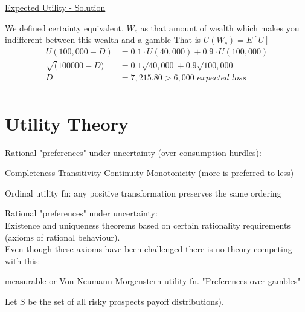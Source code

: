 \documentclass[
14pt,notheorems,hyperref={pdfauthor=whatever}
]{beamer}
\begin{document}
\begin{frame}
\underline{Expected Utility - Solution}
\hfill \break
\begin{outline}
    \1 We defined certainty equivalent, $W_c$  as that amount of wealth which makes you indifferent between this wealth and a gamble\break
    \1 That is $U(W_c) = E[U]$
    \begin{align*}
        U(100,000 - D) &= 0.1\cdot U(40,000) + 0.9\cdot U(100,000)\\
        \sqrt(100000-D) &= 0.1\sqrt{40,000} + 0.9\sqrt{100,000}\\
        D &= 7,215.80 > 6,000 \textit{ expected loss }\\
    \end{align*}
\end{outline}
\end{frame}


\section{Utility Theory}  %

\begin{frame}
Rational "preferences" under uncertainty (over consumption hurdles):\\
\begin{outline}
    \1 Completeness
    \1 Transitivity
    \1 Continuity
    \1 Monotonicity (more is preferred to less)
\end{outline}
Ordinal utility fn: any positive transformation preserves the same ordering\\
\end{frame}

\begin{frame}
Rational "preferences" under uncertainty:\\
\hfill \break
Existence and uniqueness theorems based on certain rationality requirements (axioms of rational behaviour).\\
\hfill \break
Even though these axioms have been challenged there is no theory competing with this:\\
\begin{outline}
    \1 measurable or Von Neumann-Morgenstern utility fn.
      \2 "Preferences over gambles"
\end{outline}
\hfill \break
Let $S$ be the set of all risky prospects  payoff distributions).\\
\end{frame}
\end{document}

